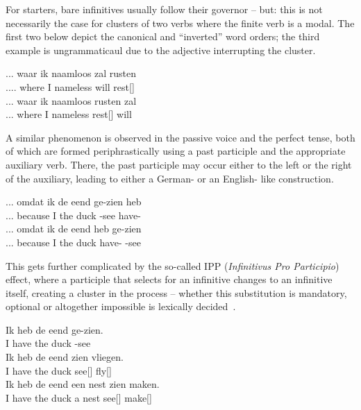 For starters, bare infinitives usually follow their governor -- but: this is not necessarily the case for clusters of two verbs where the finite verb is a modal.
The first two  below depict the canonical and ``inverted'' word orders; the third example is ungrammaticaul due to the adjective  interrupting the cluster.
\begin{exe}
\ex\label{gloss:rusten_zal}
\begin{xlist}
\ex
\gll ... waar ik naamloos zal rusten\\
.... where I nameless will rest[]\\
\ex
\gll ... waar ik naamloos rusten zal\\
... where I nameless rest[] will\\
\end{xlist}
\end{exe}
A similar phenomenon is observed in the passive voice and the perfect tense, both of which are formed periphrastically using a past participle and the appropriate auxiliary verb.
There, the past participle may occur either to the left or the right of the auxiliary, leading to either a German- or an English- like construction.
\begin{exe}
\ex\label{gloss:green_vs_red}
\begin{xlist}
\ex
\gll ... omdat ik de eend ge-zien heb\\
... because I the duck -see have-\\
\ex
\gll ... omdat ik de eend heb ge-zien\\
... because I the duck have- -see\\
\end{xlist}
\end{exe}
This gets further complicated by the so-called IPP (\textit{Infinitivus Pro Participio}) effect, where a participle that selects for an infinitive changes to an infinitive itself, creating a cluster in the process -- whether this substitution is mandatory, optional or altogether impossible is lexically decided~\cite{augustinus2015complement}.
\begin{exe}
\ex\label{gloss:ipp}
\begin{xlist}
\ex 
\gll Ik heb de eend ge-zien.\\
I have the duck -see\\
\ex
\gll Ik heb de eend zien vliegen.\\
I have the duck see[] fly[]\\
\ex\label{gloss:ipp_tv}
\gll Ik heb de eend een nest zien maken.\\
I have the duck a nest see[] make[]\\
\end{xlist}
\end{exe}

